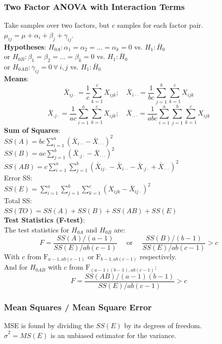 \documentclass{article}
\begin{document}
\begin{multicols*}{2}
{\color{magenta}\subsubsection*{Two Factor ANOVA with Interaction Terms}}
Take samples over two factors, but $c$ samples for each factor pair. $\mu_{ij} = \mu + \alpha_{i} + \beta_{j} + \gamma_{ij}$.\\
\textbf{Hypotheses}: $H_{0A}: \alpha_{1} = \alpha_{2} = \dots = \alpha_{k} = 0$ vs. $H_{1}: \bar{H}_{0}$\\
or $H_{0B}: \beta_{1} = \beta_{2} = \dots = \beta_{k} = 0$ vs. $H_{1}: \bar{H}_{0}$\\
or $H_{0AB}: \gamma_{ij} = 0\ \forall\ i, j$ vs. $H_{1}: \bar{H}_{0}$\\
\textbf{Means}:
$$\bar{X}_{i j \cdot} = \frac{1}{c} \sum_{k=1}^{c} X_{ijk}; \quad \bar{X}_{i \cdot \cdot} = \frac{1}{bc} \sum_{j=1}^{b} \sum_{k=1}^{c} X_{ijk}$$
$$ \bar{X}_{\cdot j \cdot} = \frac{1}{ac} \sum_{i=1}^{a} \sum_{k=1}^{c} X_{ijk}; \quad \bar{X}_{\cdot \cdot \cdot} = \frac{1}{abc} \sum_{i=1}^{a} \sum_{j=1}^{b} \sum_{k=1}^{c} X_{ijk}$$
\textbf{Sum of Squares}:\\
$SS(A) = bc \sum_{i=1}^{a} (\bar{X}_{i \cdot \cdot} - \bar{X}_{\cdot \cdot \cdot})^{2}$\\
$SS(B) = ac \sum_{j=1}^{b} (\bar{X}_{\cdot j \cdot} - \bar{X}_{\cdot \cdot \cdot})^{2}$\\
$SS(AB) = c \sum_{i=1}^{a} \sum_{j=1}^{b} (\bar{X}_{i j \cdot} - \bar{X}_{i \cdot \cdot} - \bar{X}_{\cdot j \cdot} + \bar{X}_{\cdot \cdot \cdot})^{2}$\\
Error SS:\\
$SS(E) = \sum_{i=1}^{a} \sum_{j=1}^{b} \sum_{k=1}^{c} (X_{ijk} - \bar{X}_{i j \cdot})^{2}$\\
Total SS:\\
$SS(TO) = SS(A) + SS(B) + SS(AB) + SS(E)$\\
\textbf{Test Statistics (F-test)}:\\
The test statistics for $H_{0A}$ and $H_{0B}$ are:
$$F = \frac{SS(A) / (a-1)}{SS(E) / ab(c-1)} \quad \mbox{ or } \quad \frac{SS(B) / (b-1)}{SS(E) / ab(c-1)} > c$$
With $c$ from $\mbox{F}_{a-1, ab(c-1)}$ or $\mbox{F}_{b-1, ab(c-1)}$ respectively.\\
And for $H_{0AB}$ with $c$ from $\mbox{F}_{(a-1)(b-1), ab(c-1)}$:
$$F = \frac{SS(AB) / (a-1)(b-1)}{SS(E) / ab(c-1)} > c$$

{\color{magenta}\subsubsection*{Mean Squares / Mean Square Error}}
MSE is found by dividing the $SS(E)$ by its degrees of freedom.\\
{\color{blue} $\hat{\sigma}^{2} = MS(E)$ is an unbiased estimator for the variance.}


\end{multicols*}
\end{document}
